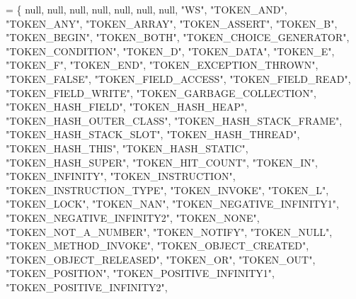 \begin{DoxyCode}
= \{
    null, null, null, null, null, null, null, \textcolor{stringliteral}{"WS"}, \textcolor{stringliteral}{"TOKEN\_AND"}, \textcolor{stringliteral}{"TOKEN\_ANY"}, 
    \textcolor{stringliteral}{"TOKEN\_ARRAY"}, \textcolor{stringliteral}{"TOKEN\_ASSERT"}, \textcolor{stringliteral}{"TOKEN\_B"}, \textcolor{stringliteral}{"TOKEN\_BEGIN"}, \textcolor{stringliteral}{"TOKEN\_BOTH"}, 
    \textcolor{stringliteral}{"TOKEN\_CHOICE\_GENERATOR"}, \textcolor{stringliteral}{"TOKEN\_CONDITION"}, \textcolor{stringliteral}{"TOKEN\_D"}, \textcolor{stringliteral}{"TOKEN\_DATA"}, 
    \textcolor{stringliteral}{"TOKEN\_E"}, \textcolor{stringliteral}{"TOKEN\_F"}, \textcolor{stringliteral}{"TOKEN\_END"}, \textcolor{stringliteral}{"TOKEN\_EXCEPTION\_THROWN"}, \textcolor{stringliteral}{"TOKEN\_FALSE"}, 
    \textcolor{stringliteral}{"TOKEN\_FIELD\_ACCESS"}, \textcolor{stringliteral}{"TOKEN\_FIELD\_READ"}, \textcolor{stringliteral}{"TOKEN\_FIELD\_WRITE"}, \textcolor{stringliteral}{"TOKEN\_GARBAGE\_COLLECTION"}, 
    \textcolor{stringliteral}{"TOKEN\_HASH\_FIELD"}, \textcolor{stringliteral}{"TOKEN\_HASH\_HEAP"}, \textcolor{stringliteral}{"TOKEN\_HASH\_OUTER\_CLASS"}, \textcolor{stringliteral}{"TOKEN\_HASH\_STACK\_FRAME"}, 
    \textcolor{stringliteral}{"TOKEN\_HASH\_STACK\_SLOT"}, \textcolor{stringliteral}{"TOKEN\_HASH\_THREAD"}, \textcolor{stringliteral}{"TOKEN\_HASH\_THIS"}, \textcolor{stringliteral}{"TOKEN\_HASH\_STATIC"}, 
    \textcolor{stringliteral}{"TOKEN\_HASH\_SUPER"}, \textcolor{stringliteral}{"TOKEN\_HIT\_COUNT"}, \textcolor{stringliteral}{"TOKEN\_IN"}, \textcolor{stringliteral}{"TOKEN\_INFINITY"}, \textcolor{stringliteral}{"TOKEN\_INSTRUCTION"}, 
    \textcolor{stringliteral}{"TOKEN\_INSTRUCTION\_TYPE"}, \textcolor{stringliteral}{"TOKEN\_INVOKE"}, \textcolor{stringliteral}{"TOKEN\_L"}, \textcolor{stringliteral}{"TOKEN\_LOCK"}, \textcolor{stringliteral}{"TOKEN\_NAN"}, 
    \textcolor{stringliteral}{"TOKEN\_NEGATIVE\_INFINITY1"}, \textcolor{stringliteral}{"TOKEN\_NEGATIVE\_INFINITY2"}, \textcolor{stringliteral}{"TOKEN\_NONE"}, 
    \textcolor{stringliteral}{"TOKEN\_NOT\_A\_NUMBER"}, \textcolor{stringliteral}{"TOKEN\_NOTIFY"}, \textcolor{stringliteral}{"TOKEN\_NULL"}, \textcolor{stringliteral}{"TOKEN\_METHOD\_INVOKE"}, 
    \textcolor{stringliteral}{"TOKEN\_OBJECT\_CREATED"}, \textcolor{stringliteral}{"TOKEN\_OBJECT\_RELEASED"}, \textcolor{stringliteral}{"TOKEN\_OR"}, \textcolor{stringliteral}{"TOKEN\_OUT"}, 
    \textcolor{stringliteral}{"TOKEN\_POSITION"}, \textcolor{stringliteral}{"TOKEN\_POSITIVE\_INFINITY1"}, \textcolor{stringliteral}{"TOKEN\_POSITIVE\_INFINITY2"}, 

\end{DoxyCode}
